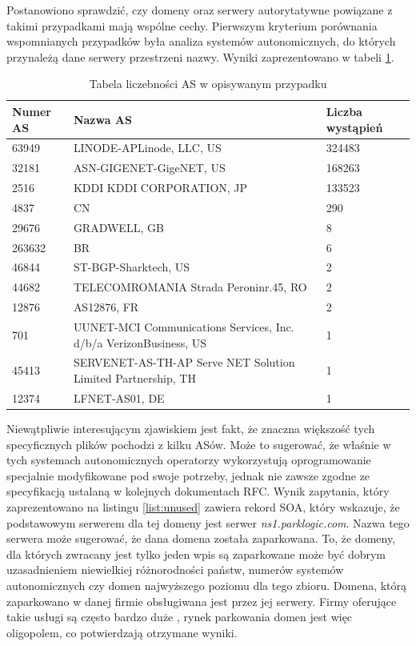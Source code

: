 Postanowiono sprawdzić, czy domeny oraz serwery autorytatywne powiązane z takimi przypadkami mają
wspólne cechy. Pierwszym kryterium porównania wspomnianych przypadków była analiza systemów autonomicznych, do których przynależą
dane serwery przestrzeni nazwy. Wyniki zaprezentowano w tabeli \ref{tab:unused}.
\begin{table}[h]
	\centering
	\label{tab:unused}
	\begin{tabular}{|p{}|p{}|p{}|}
		\hline
		\textbf{Numer AS} &
		\textbf{Nazwa AS} &
		\textbf{Liczba wystąpień} \\
		\hline\hline
		63949 & LINODE-APLinode, LLC, US & 324483 \\
		\hline
		32181 & ASN-GIGENET-GigeNET, US & 168263 \\
		\hline
		2516 & KDDI KDDI CORPORATION, JP & 133523 \\
		\hline
		4837 &  CN & 290 \\
		\hline
		29676 & GRADWELL, GB & 8 \\
		\hline
		263632 & BR & 6 \\
		\hline
		46844 & ST-BGP-Sharktech, US & 2 \\
		\hline
		44682 & TELECOMROMANIA Strada Peroninr.45, RO & 2 \\
		\hline
		12876 & AS12876, FR & 2 \\
		\hline
		701 & UUNET-MCI Communications Services, Inc. d/b/a VerizonBusiness, US & 1 \\
		\hline
		45413 & SERVENET-AS-TH-AP Serve NET Solution Limited Partnership, TH & 1 \\
		\hline
		12374 & LFNET-AS01, DE & 1 \\
		\hline
	\end{tabular}
	\caption{Tabela liczebności AS w opisywanym przypadku}
\end{table}

Niewątpliwie interesującym zjawiskiem jest fakt, że znaczna większość tych specyficznych plików pochodzi z kilku ASów.
Może to sugerować, że właśnie w tych systemach autonomicznych operatorzy wykorzystują oprogramowanie specjalnie modyfikowane
pod swoje potrzeby, jednak nie zawsze zgodne ze specyfikacją ustalaną w kolejnych dokumentach RFC. Wynik zapytania, który zaprezentowano
na listingu \ref{list:unused} zawiera rekord SOA, który wskazuje, że podstawowym serwerem dla tej domeny jest
serwer \textit{ns1.parklogic.com}. Nazwa tego serwera może sugerować, że dana domena została zaparkowana. To, że domeny, dla których
zwracany jest tylko jeden wpis są zaparkowane może być dobrym uzasadnieniem niewielkiej różnorodności państw, numerów systemów
autonomicznych czy domen najwyższego poziomu dla tego zbioru. Domena, którą zaparkowano w danej firmie obsługiwana jest przez jej serwery.
Firmy oferujące takie usługi są często bardzo duże \cite{sedo}, rynek parkowania domen jest więc oligopolem, co potwierdzają otrzymane
wyniki.

